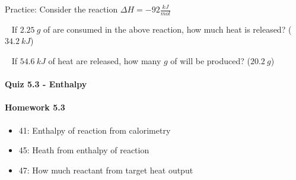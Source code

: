 \documentclass[12pt, openany, letterpaper]{memoir}
\begin{document}
\begin{itemize}
\begin{itemize}
          Practice: Consider the reaction  $\Delta H = -92\frac{kJ}{mol}$

          ~\hphantom{Practice:} If $2.25~g$ of  are consumed in the above reaction, how much heat is released? ($34.2~kJ$)

          ~\hphantom{Practice:} If $54.6~kJ$ of heat are released, how many $g$ of  will be produced? ($20.2~g$)
  \end{itemize}
\end{itemize}

\paragraph*{Quiz 5.3 - Enthalpy}
\paragraph*{Homework 5.3}
\begin{itemize}
  \item 41: Enthalpy of reaction from calorimetry
  \item 45: Heath from enthalpy of reaction
  \item 47: How much reactant from target heat output
\end{itemize}
\end{document}
